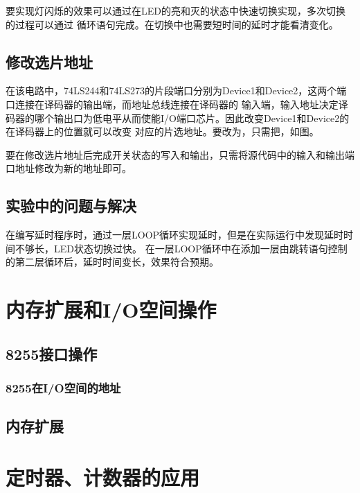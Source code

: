 \documentclass[12pt, a4paper, oneside]{ctexart}
\begin{document}
    要实现灯闪烁的效果可以通过在LED的亮和灭的状态中快速切换实现，多次切换的过程可以通过
    循环语句完成。在切换中也需要短时间的延时才能看清变化。
    \subsection{修改选片地址}
    在该电路中，74LS244和74LS273的片段端口分别为Device1和Device2，这两个端口连接在译码器的输出端，而地址总线连接在译码器的
    输入端，输入地址决定译码器的哪个输出口为低电平从而使能I/O端口芯片。因此改变Device1和Device2的在译码器上的位置就可以改变
    对应的片选地址。要改为，只需把，如图。

    要在修改选片地址后完成开关状态的写入和输出，只需将源代码中的输入和输出端口地址修改为新的地址即可。

    \subsection{实验中的问题与解决}
    在编写延时程序时，通过一层LOOP循环实现延时，但是在实际运行中发现延时时间不够长，LED状态切换过快。
    在一层LOOP循环中在添加一层由跳转语句控制的第二层循环后，延时时间变长，效果符合预期。
    \section{内存扩展和I/O空间操作}
    \subsection{8255接口操作}
    \subsubsection{8255在I/O空间的地址}

    \subsection{内存扩展}

    \section{定时器、计数器的应用}

    
\end{document}
